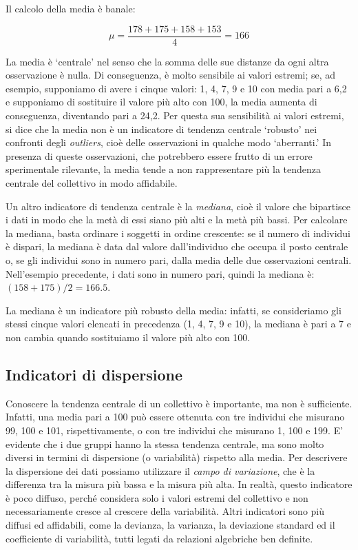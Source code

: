 \documentclass[a4paper,12pt,oneside]{book}
\begin{document}
Il calcolo della media è banale:

\[\mu = \frac{178 + 175 + 158 + 153}{4} = 166\]

La media è `centrale' nel senso che la somma delle sue distanze da ogni altra osservazione è nulla. Di conseguenza, è molto sensibile ai valori estremi; se, ad esempio, supponiamo di avere i cinque valori: 1, 4, 7, 9 e 10 con media pari a 6,2 e supponiamo di sostituire il valore più alto con 100, la media aumenta di conseguenza, diventando pari a 24,2. Per questa sua sensibilità ai valori estremi, si dice che la media non è un indicatore di tendenza centrale `robusto' nei confronti degli \emph{outliers}, cioè delle osservazioni in qualche modo `aberranti.' In presenza di queste osservazioni, che potrebbero essere frutto di un errore sperimentale rilevante, la media tende a non rappresentare più la tendenza centrale del collettivo in modo affidabile.

Un altro indicatore di tendenza centrale è la \emph{mediana}, cioè il valore che bipartisce i dati in modo che la metà di essi siano più alti e la metà più bassi. Per calcolare la mediana, basta ordinare i soggetti in ordine crescente: se il numero di individui è dispari, la mediana è data dal valore dall'individuo che occupa il posto centrale o, se gli individui sono in numero pari, dalla media delle due osservazioni centrali. Nell'esempio precedente, i dati sono in numero pari, quindi la mediana è: \((158 + 175)/2 = 166.5\).

La mediana è un indicatore più robusto della media: infatti, se consideriamo gli stessi cinque valori elencati in precedenza (1, 4, 7, 9 e 10), la mediana è pari a 7 e non cambia quando sostituiamo il valore più alto con 100.

\hypertarget{indicatori-di-dispersione}{%
\subsection{Indicatori di dispersione}\label{indicatori-di-dispersione}}

Conoscere la tendenza centrale di un collettivo è importante, ma non è sufficiente. Infatti, una media pari a 100 può essere ottenuta con tre individui che misurano 99, 100 e 101, rispettivamente, o con tre individui che misurano 1, 100 e 199. E' evidente che i due gruppi hanno la stessa tendenza centrale, ma sono molto diversi in termini di dispersione (o variabilità) rispetto alla media. Per descrivere la dispersione dei dati possiamo utilizzare il \emph{campo di variazione}, che è la differenza tra la misura più bassa e la misura più alta. In realtà, questo indicatore è poco diffuso, perché considera solo i valori estremi del collettivo e non necessariamente cresce al crescere della variabilità. Altri indicatori sono più diffusi ed affidabili, come la devianza, la varianza, la deviazione standard ed il coefficiente di variabilità, tutti legati da relazioni algebriche ben definite.
\end{document}

